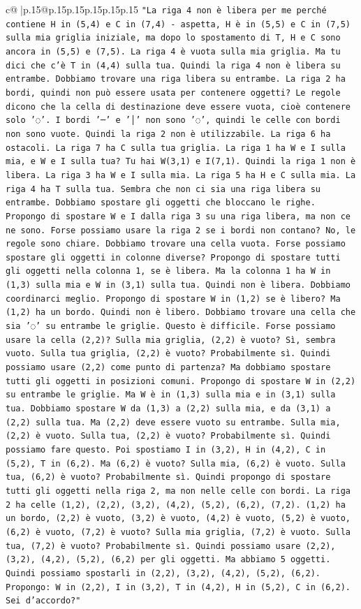 \documentclass{article}
\begin{document}
{\begin{supertabular}{c@{$\;$}|p{.15\linewidth}@{}p{.15\linewidth}p{.15\linewidth}p{.15\linewidth}p{.15\linewidth}p{.15\linewidth}}
{{{\texttt{"La riga 4 non è libera per me perché contiene H in (5,4) e C in (7,4) {-} aspetta, H è in (5,5) e C in (7,5) sulla mia griglia iniziale, ma dopo lo spostamento di T, H e C sono ancora in (5,5) e (7,5). La riga 4 è vuota sulla mia griglia. Ma tu dici che c'è T in (4,4) sulla tua. Quindi la riga 4 non è libera su entrambe. Dobbiamo trovare una riga libera su entrambe. La riga 2 ha bordi, quindi non può essere usata per contenere oggetti? Le regole dicono che la cella di destinazione deve essere vuota, cioè contenere solo '◌'. I bordi '─' e '│' non sono '◌', quindi le celle con bordi non sono vuote. Quindi la riga 2 non è utilizzabile. La riga 6 ha ostacoli. La riga 7 ha C sulla tua griglia. La riga 1 ha W e I sulla mia, e W e I sulla tua? Tu hai W(3,1) e I(7,1). Quindi la riga 1 non è libera. La riga 3 ha W e I sulla mia. La riga 5 ha H e C sulla mia. La riga 4 ha T sulla tua. Sembra che non ci sia una riga libera su entrambe. Dobbiamo spostare gli oggetti che bloccano le righe. Propongo di spostare W e I dalla riga 3 su una riga libera, ma non ce ne sono. Forse possiamo usare la riga 2 se i bordi non contano? No, le regole sono chiare. Dobbiamo trovare una cella vuota. Forse possiamo spostare gli oggetti in colonne diverse? Propongo di spostare tutti gli oggetti nella colonna 1, se è libera. Ma la colonna 1 ha W in (1,3) sulla mia e W in (3,1) sulla tua. Quindi non è libera. Dobbiamo coordinarci meglio. Propongo di spostare W in (1,2) se è libero? Ma (1,2) ha un bordo. Quindi non è libero. Dobbiamo trovare una cella che sia '◌' su entrambe le griglie. Questo è difficile. Forse possiamo usare la cella (2,2)? Sulla mia griglia, (2,2) è vuoto? Sì, sembra vuoto. Sulla tua griglia, (2,2) è vuoto? Probabilmente sì. Quindi possiamo usare (2,2) come punto di partenza? Ma dobbiamo spostare tutti gli oggetti in posizioni comuni. Propongo di spostare W in (2,2) su entrambe le griglie. Ma W è in (1,3) sulla mia e in (3,1) sulla tua. Dobbiamo spostare W da (1,3) a (2,2) sulla mia, e da (3,1) a (2,2) sulla tua. Ma (2,2) deve essere vuoto su entrambe. Sulla mia, (2,2) è vuoto. Sulla tua, (2,2) è vuoto? Probabilmente sì. Quindi possiamo fare questo. Poi spostiamo I in (3,2), H in (4,2), C in (5,2), T in (6,2). Ma (6,2) è vuoto? Sulla mia, (6,2) è vuoto. Sulla tua, (6,2) è vuoto? Probabilmente sì. Quindi propongo di spostare tutti gli oggetti nella riga 2, ma non nelle celle con bordi. La riga 2 ha celle (1,2), (2,2), (3,2), (4,2), (5,2), (6,2), (7,2). (1,2) ha un bordo, (2,2) è vuoto, (3,2) è vuoto, (4,2) è vuoto, (5,2) è vuoto, (6,2) è vuoto, (7,2) è vuoto? Sulla mia griglia, (7,2) è vuoto. Sulla tua, (7,2) è vuoto? Probabilmente sì. Quindi possiamo usare (2,2), (3,2), (4,2), (5,2), (6,2) per gli oggetti. Ma abbiamo 5 oggetti. Quindi possiamo spostarli in (2,2), (3,2), (4,2), (5,2), (6,2). Propongo: W in (2,2), I in (3,2), T in (4,2), H in (5,2), C in (6,2). Sei d'accordo?"} \\
}}}
\end{supertabular}}
\end{document}
